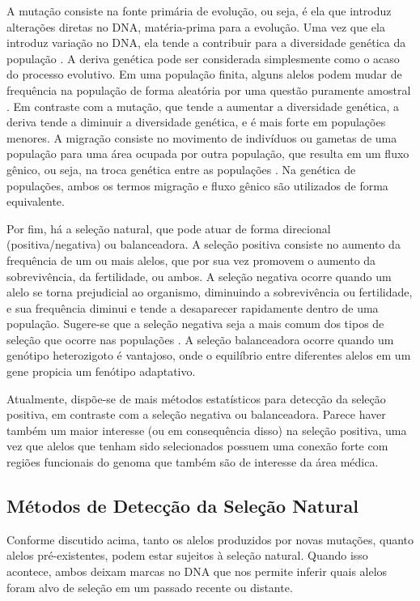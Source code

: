 A mutação consiste na fonte primária de evolução, ou seja, é ela que introduz alterações diretas no DNA, matéria-prima para a evolução. Uma vez que ela introduz variação no DNA, ela tende a contribuir para a diversidade genética da população \cite{losos_princeton_2014}. A deriva genética pode ser considerada simplesmente como o acaso do processo evolutivo. Em uma população finita, alguns alelos podem mudar de frequência na população de forma aleatória por uma questão puramente amostral \cite{templeton_population_2006}. Em contraste com a mutação, que tende a aumentar a diversidade genética, a deriva tende a diminuir a diversidade genética, e é mais forte em populações menores. A migração consiste no movimento de indivíduos ou gametas de uma população para uma área ocupada por outra população,  que resulta em um fluxo gênico, ou seja, na troca genética entre as populações \cite{templeton_population_2006}. Na genética de populações, ambos os termos migração e fluxo gênico são utilizados de forma equivalente.

Por fim, há a seleção natural, que pode atuar de forma direcional (positiva/negativa) ou balanceadora. A seleção positiva consiste no aumento da frequência de um ou mais alelos, que por sua vez promovem o aumento da sobrevivência, da fertilidade, ou ambos. A seleção negativa ocorre quando um alelo se torna prejudicial ao organismo, diminuindo a sobrevivência ou fertilidade, e sua frequência diminui e tende a desaparecer rapidamente dentro de uma população. Sugere-se que a seleção negativa seja a mais comum dos tipos de seleção que ocorre nas populações \cite{pouyet_background_2018, salas_natural_2019}. A seleção balanceadora ocorre quando um genótipo heterozigoto é vantajoso, onde o equilíbrio entre diferentes alelos em um gene propicia um fenótipo adaptativo.

Atualmente, dispõe-se de mais métodos estatísticos para detecção da seleção positiva, em contraste com a seleção negativa ou balanceadora. Parece haver também um maior interesse (ou em consequência disso) na seleção positiva, uma vez que alelos que tenham sido selecionados possuem uma conexão forte com regiões funcionais do genoma que também são de interesse da área médica. 

\subsection{Métodos de Detecção da Seleção Natural}

Conforme discutido acima, tanto os alelos produzidos por novas mutações, quanto alelos pré-existentes, podem estar sujeitos à seleção natural. Quando isso acontece, ambos deixam marcas no DNA que nos permite inferir quais alelos foram alvo de seleção em um passado recente ou distante.

